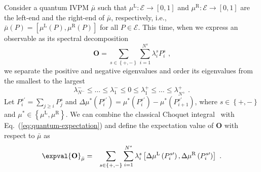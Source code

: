 \documentclass[english,reprint, aps, prl,superscriptaddress, showpacs,
showkeys, longbibliography, amsmath, amssymb]{revtex4-1}
\theoremstyle{plain}
\theoremstyle{definition}
\newcommand{\events}{\ensuremath{\mathcal{E}}}
\newcommand{\mul}[1][]{\ensuremath{\mu^{\mathrm{L{#1}}}}}
\newcommand{\mur}[1][]{\ensuremath{\mu^{\mathrm{R{#1}}}}}
\begin{document}
Consider a quantum IVPM $\bar{\mu}$ such that $\mul:\events\rightarrow\left[0,1\right]$
and $\mur:\events\rightarrow\left[0,1\right]$ are the left-end and
the right-end of $\bar{\mu}$, respectively, i.e., $\bar{\mu}\left(P\right)=\left[\mul\left(P\right),\mur\left(P\right)\right]$
for all $P\in\events$. This time, when we express an observable as
its spectral decomposition
\begin{equation}
\mathbf{O}=\sum_{s\in\left\{ +,-\right\} }\sum_{i=1}^{N^{s}}\lambda_{i}^{s}P_{i}^{s}\textrm{ ,}\label{eq:spectrum-decomposition}
\end{equation}
we separate the positive and negative eigenvalues and order its eigenvalues
from the smallest to the largest 
\begin{equation}
\lambda_{N^{-}}^{-}\le\ldots\le\lambda_{1}^{-}\le0\le\lambda_{1}^{+}\le\ldots\le\lambda_{N^{+}}^{+}\textrm{ .}
\end{equation}
Let $P_{i}^{s\prime}=\sum_{j\ge i}P_{j}^{s}$ and $\Delta\mu^{*}\left(P_{i}^{s\prime}\right)=\mu^{*}\left(P_{i}^{s\prime}\right)-\mu^{*}\left(P_{i+1}^{s\prime}\right)$,
where $s\in\left\{ +,-\right\} $ and $\mu^{*}\in\left\{ \mul,\mur\right\} $.
We can combine the classical Choquet integral~\cite{Vitali1925,Choquet1954,GilboaSchmeidler1994,Grabisch2016}
with Eq.~(\ref{eq:quantum-expectation}) and define the expectation
value of $\mathbf{O}$ with respect to $\bar{\mu}$ as
\begin{eqnarray}
\expval{\mathbf{O}}_{\bar{\mu}} & = & \sum_{s\in\left\{ +,-\right\} }\sum_{i=1}^{N^{s}}\lambda_{i}^{s}\left[\Delta\mul\left(P_{i}^{s\prime}\right),\Delta\mur\left(P_{i}^{s\prime}\right)\right]\textrm{ .}\label{eq:quantum-interval-expectation}
\end{eqnarray}
\end{document}
